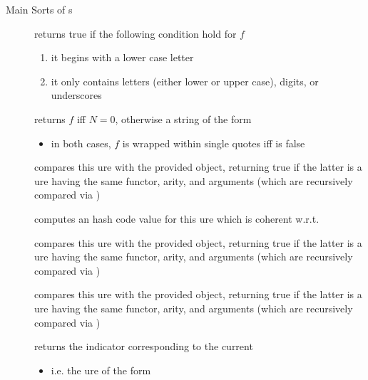 \documentclass[handout]{beamer}
\begin{document}
\begin{frame}[allowframebreaks]{Main Sorts of s}
\begin{description}
        \item[] returns true if the following condition hold for $f$
        \begin{enumerate}\small
            \item it begins with a lower case letter
            \item it only contains letters (either lower or upper case), digits, or underscores
        \end{enumerate}
        \item[] returns $f$ iff $N = 0$, otherwise a string of the form
        \begin{center}
        \end{center}
        \begin{itemize}\small
            \item in both cases, $f$ is wrapped within single quotes iff  is false
        \end{itemize}
        \item[] compares this ure with the provided object, returning true if the latter is a ure having the same functor, arity, and arguments (which are recursively compared via )
        \item[] computes an hash code value for this ure which is coherent w.r.t. 
        \item[] compares this ure with the provided object, returning true if the latter is a ure having the same functor, arity, and arguments (which are recursively compared via )
        \item[] compares this ure with the provided object, returning true if the latter is a ure having the same functor, arity, and arguments (which are recursively compared via )
        \item[] returns the indicator corresponding to the current 
        \begin{itemize}\small
            \item i.e. the ure of the form 
        \end{itemize}

\end{description}
\end{frame}
\end{document}
